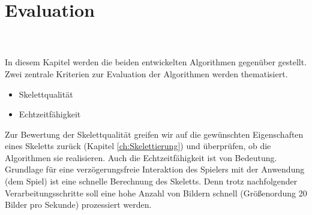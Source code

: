 \chapter{Evaluation}
\\\\
In diesem Kapitel werden die beiden entwickelten Algorithmen gegenüber gestellt. Zwei zentrale Kriterien zur Evaluation der Algorithmen werden thematisiert.
\begin{itemize}
\item Skelettqualität
\item Echtzeitfähigkeit
\end{itemize}
Zur Bewertung der Skelettqualität greifen wir auf die
gewünschten Eigenschaften eines Skeletts zurück (Kapitel \ref{ch:Skelettierung}) und überprüfen, ob die Algorithmen sie realisieren. Auch die Echtzeitfähigkeit ist von Bedeutung. Grundlage für eine verzögerungsfreie Interaktion des Spielers mit der Anwendung (dem Spiel) ist eine schnelle Berechnung des Skeletts. Denn trotz nachfolgender Verarbeitungsschritte soll eine hohe Anzahl von Bildern schnell (Größenordung 20 Bilder pro Sekunde) prozessiert werden.
